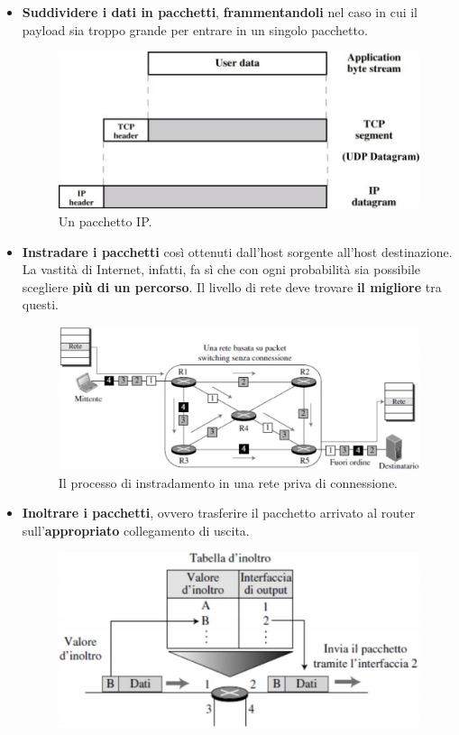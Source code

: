 \documentclass[11pt,a4paper,oneside]{book}
\theoremstyle{definition}
\begin{document}
\begin{itemize}
	\item \textbf{Suddividere i dati in pacchetti}, \textbf{frammentandoli} nel caso in cui il payload sia troppo grande per entrare in un singolo pacchetto.\\
	      \begin{figure}[!h]
		      \includegraphics[scale=0.2]{Immagini/Ip_p.png}
		      \centering
		      \caption{Un pacchetto IP.}
	      \end{figure}
	\item \textbf{Instradare i pacchetti} così ottenuti dall'host sorgente all'host destinazione. La vastità di Internet, infatti, fa sì che con ogni probabilità sia possibile scegliere \textbf{più di un percorso}. Il livello di rete deve trovare \textbf{il migliore} tra questi.
	      \begin{figure}[!h]
		      \includegraphics[scale=0.3]{Immagini/Ip_instr.png}
		      \centering
		      \caption{Il processo di instradamento in una rete priva di connessione.}
	      \end{figure}
	\item \textbf{Inoltrare i pacchetti}, ovvero trasferire il pacchetto arrivato al router sull’\textbf{appropriato} collegamento di uscita.
	      \begin{figure}[!h]
		      \includegraphics[scale=0.25]{Immagini/Ip_table.png}

\end{figure}
\end{itemize}
\end{document}
